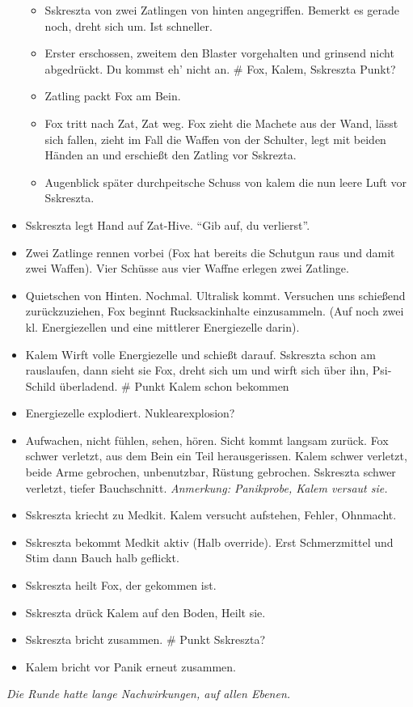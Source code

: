 \documentclass[11pt]{article}
\begin{document}
\begin{itemize}
  \begin{itemize}
  \item
    Sskreszta von zwei Zatlingen von hinten angegriffen. Bemerkt es
    gerade noch, dreht sich um. Ist schneller.
  \item
    Erster erschossen, zweitem den Blaster vorgehalten und grinsend
    nicht abgedrückt. Du kommst eh' nicht an. \# Fox, Kalem, Sskreszta
    Punkt?
  \item
    Zatling packt Fox am Bein.
  \item
    Fox tritt nach Zat, Zat weg. Fox zieht die Machete aus der Wand,
    lässt sich fallen, zieht im Fall die Waffen von der Schulter, legt
    mit beiden Händen an und erschießt den Zatling vor Sskrezta.
  \item
    Augenblick später durchpeitsche Schuss von kalem die nun leere Luft
    vor Sskreszta.
  \end{itemize}
\item
  Sskreszta legt Hand auf Zat-Hive. ``Gib auf, du verlierst''.
\item
  Zwei Zatlinge rennen vorbei (Fox hat bereits die Schutgun raus und
  damit zwei Waffen). Vier Schüsse aus vier Waffne erlegen zwei
  Zatlinge.
\item
  Quietschen von Hinten. Nochmal. Ultralisk kommt. Versuchen uns
  schießend zurückzuziehen, Fox beginnt Rucksackinhalte einzusammeln.
  (Auf noch zwei kl. Energiezellen und eine mittlerer Energiezelle
  darin).
\item
  Kalem Wirft volle Energiezelle und schießt darauf. Sskreszta schon am
  rauslaufen, dann sieht sie Fox, dreht sich um und wirft sich über ihn,
  Psi-Schild überladend. \# Punkt Kalem schon bekommen
\item
  Energiezelle explodiert. Nuklearexplosion?
\item
  Aufwachen, nicht fühlen, sehen, hören. Sicht kommt langsam zurück. Fox
  schwer verletzt, aus dem Bein ein Teil herausgerissen. Kalem schwer
  verletzt, beide Arme gebrochen, unbenutzbar, Rüstung gebrochen.
  Sskreszta schwer verletzt, tiefer Bauchschnitt. \emph{Anmerkung:
  Panikprobe, Kalem versaut sie.}
\item
  Sskreszta kriecht zu Medkit. Kalem versucht aufstehen, Fehler,
  Ohnmacht.
\item
  Sskreszta bekommt Medkit aktiv (Halb override). Erst Schmerzmittel und
  Stim dann Bauch halb geflickt.
\item
  Sskreszta heilt Fox, der gekommen ist.
\item
  Sskreszta drück Kalem auf den Boden, Heilt sie.
\item
  Sskreszta bricht zusammen. \# Punkt Sskreszta?
\item
  Kalem bricht vor Panik erneut zusammen.
\end{itemize}
\emph{Die Runde hatte lange Nachwirkungen, auf allen Ebenen.}
\end{document}
